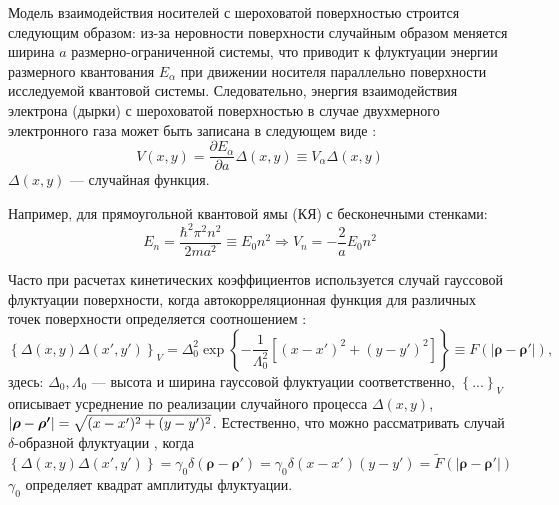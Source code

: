 Модель взаимодействия носителей с шероховатой поверхностью строится следующим образом: из-за неровности поверхности случайным образом меняется ширина $a$ размерно-ограниченной системы, что приводит к флуктуации энергии размерного квантования $E_{\alpha}$ при движении носителя параллельно поверхности исследуемой квантовой системы. Следовательно, энергия взаимодействия электрона (дырки) с шероховатой поверхностью в случае двухмерного электронного газа может быть записана в следующем виде \cite{Sakaki1987}:
\begin{equation}
V(x,y)=\frac{\partial E_{\alpha}}{\partial a}\Delta(x,y)\equiv V_{\alpha} \Delta(x,y)
\end{equation}
$\Delta(x,y)$ --- случайная функция.

Например, для прямоугольной квантовой ямы (КЯ) с бесконечными стенками:
\begin{equation}
E_n = \frac{\hbar^2 \pi^2 n^2}{2ma^2} \equiv E_0 n^2 \Rightarrow V_n = -\frac{2}{a}E_0 n^2
\end{equation}

Часто при расчетах кинетических коэффициентов используется случай гауссовой флуктуации поверхности, когда автокорреляционная функция для различных точек поверхности определяется соотношением \cite{Sakaki1987,Shchurova2009,Pozdnyakov2006,Khanh2016,Gold1987,Thongnum2008,Su2013}:
\begin{equation}
\left\{ \Delta(x,y)\Delta(x',y') \right\}_V = \Delta_0^2 \exp \left\lbrace - \frac{1}{\Lambda_0^2} \left[ (x-x')^2 +(y-y')^2 \right] \right\rbrace \equiv F \left( \left| \boldsymbol{\rho} - \boldsymbol{\rho'} \right| \right),
\end{equation}
здесь:
$\Delta_0, \Lambda_0$ --- высота и ширина гауссовой флуктуации соответственно, 
$\left\{ ... \right\}_V$
описывает усреднение по реализации случайного процесса 
$\Delta(x,y)$, $\left| \boldsymbol{\mathbf{\rho}} - \boldsymbol{\mathbf{\rho'}} \right| = \sqrt{(x-x')^2 + (y-y')^2}$.
Естественно, что можно рассматривать случай $\delta$-образной флуктуации \cite{Lozovik1998}, когда
\begin{equation}
\left\{ \Delta(x,y)\Delta(x',y') \right\} = \gamma_0\delta\left( \boldsymbol{\rho} - \boldsymbol{\rho'} \right) = \gamma_0\delta(x-x')(y-y')=\tilde{F} \left(\left| \boldsymbol{\rho} - \boldsymbol{\rho'} \right|\right)
\end{equation}
$\gamma_0$ определяет квадрат амплитуды флуктуации.

